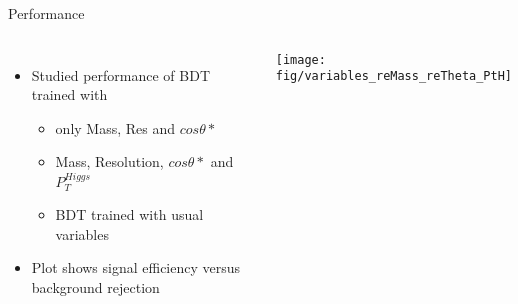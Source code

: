 \documentclass[t]{beamer}
\begin{document}
\begin{frame}{Performance}
  \begin{columns}[c]
  \begin{itemize}
    \item Studied performance of BDT trained with 
    \begin{itemize}
      \item only Mass, Res and $cos\theta*$ 
      \item Mass, Resolution, $cos\theta*$ and $P_T^{Higgs}$
      \item BDT trained with usual variables
    \end{itemize}
    \item Plot shows signal efficiency versus background rejection
  \end{itemize}
    \texttt{[image: fig/variables\_reMass\_reTheta\_PtH]}
  \end{columns}
\end{frame}
\end{document}
